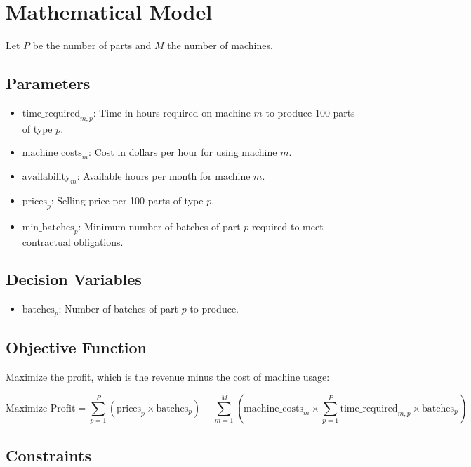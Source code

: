 \documentclass{article}
\begin{document}
\section*{Mathematical Model}

Let \( P \) be the number of parts and \( M \) the number of machines.

\subsection*{Parameters}

\begin{itemize}
    \item \( \text{time\_required}_{m,p} \): Time in hours required on machine \( m \) to produce 100 parts of type \( p \).
    \item \( \text{machine\_costs}_m \): Cost in dollars per hour for using machine \( m \).
    \item \( \text{availability}_m \): Available hours per month for machine \( m \).
    \item \( \text{prices}_p \): Selling price per 100 parts of type \( p \).
    \item \( \text{min\_batches}_p \): Minimum number of batches of part \( p \) required to meet contractual obligations.
\end{itemize}

\subsection*{Decision Variables}

\begin{itemize}
    \item \( \text{batches}_p \): Number of batches of part \( p \) to produce.
\end{itemize}

\subsection*{Objective Function}

Maximize the profit, which is the revenue minus the cost of machine usage:

\[
\text{Maximize } \text{Profit} = \sum_{p=1}^{P} \left( \text{prices}_p \times \text{batches}_p \right) - \sum_{m=1}^{M} \left( \text{machine\_costs}_m \times \sum_{p=1}^{P} \text{time\_required}_{m,p} \times \text{batches}_p \right)
\]

\subsection*{Constraints}
\end{document}
